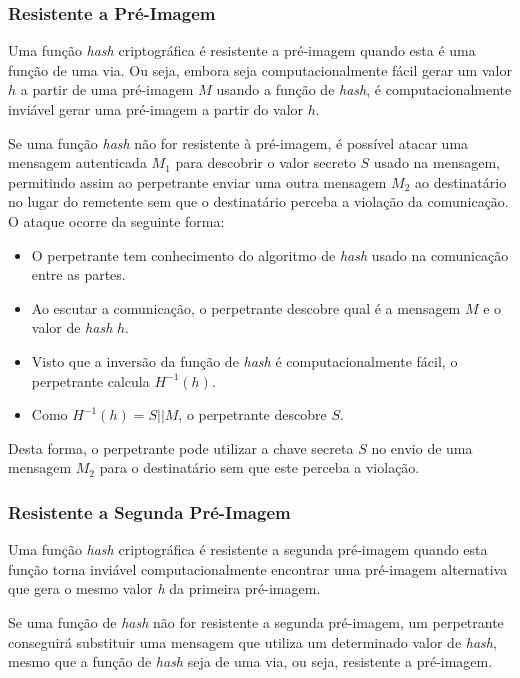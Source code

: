\documentclass[12pt]{article}
\begin{document}
\subsubsection{Resistente a Pré-Imagem}

Uma função \textit{hash} criptográfica é resistente a pré-imagem quando esta é
uma função de uma via. Ou seja, embora seja computacionalmente fácil gerar um
valor $h$ a partir de uma pré-imagem $M$ usando a função de \textit{hash}, é
computacionalmente inviável gerar uma pré-imagem a partir do valor $h$.

Se uma função \textit{hash} não for resistente à pré-imagem, é possível atacar
uma mensagem autenticada $M_1$ para descobrir o valor secreto $S$ usado na
mensagem, permitindo assim ao perpetrante enviar uma outra mensagem $M_2$ ao
destinatário no lugar do remetente sem que o destinatário perceba a violação da
comunicação. O ataque ocorre da seguinte forma:
\begin{itemize}
    \item O perpetrante tem conhecimento do algoritmo de \textit{hash} usado na
        comunicação entre as partes.
    \item Ao escutar a comunicação, o perpetrante descobre qual é a mensagem
        $M$ e o valor de \textit{hash} $h$.
    \item Visto que a inversão da função de \textit{hash} é computacionalmente
        fácil, o perpetrante calcula $H^{-1}(h)$.
    \item Como $H^{-1}(h) = S || M$, o perpetrante descobre $S$.
\end{itemize}

Desta forma, o perpetrante pode utilizar a chave secreta $S$ no envio de uma
mensagem $M_2$ para o destinatário sem que este perceba a violação.

\subsubsection{Resistente a Segunda Pré-Imagem}

Uma função \textit{hash} criptográfica é resistente a segunda pré-imagem
quando esta função torna inviável computacionalmente encontrar uma pré-imagem
alternativa que gera o mesmo valor \textit{h} da primeira pré-imagem.

Se uma função de \textit{hash} não for resistente a segunda pré-imagem, um
perpetrante conseguirá substituir uma mensagem que utiliza um determinado valor
de \textit{hash}, mesmo que a função de \textit{hash} seja de uma via, ou seja,
resistente a pré-imagem.
\end{document}
